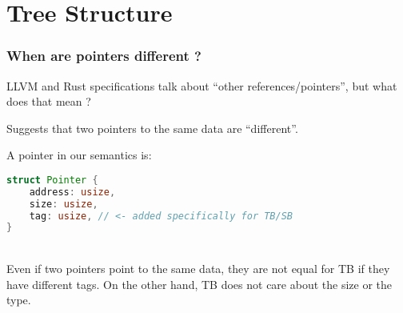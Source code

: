 \section{Tree Structure}


\begin{frame}[fragile]
    \frametitle{When are pointers different ?}
    LLVM and Rust specifications talk about ``other references/pointers'', but what does that mean ?

    Suggests that two pointers to the same data are ``different''.

    A pointer in our semantics is:
    \begin{lstlisting}[language=rust]
struct Pointer {
    address: usize,
    size: usize,
    tag: usize, // <- added specifically for TB/SB
}
    \end{lstlisting}~\\

    Even if two pointers point to the same data, they are not equal for TB
    if they have different tags.
    On the other hand, TB does not care about the size or the type.
\end{frame}


